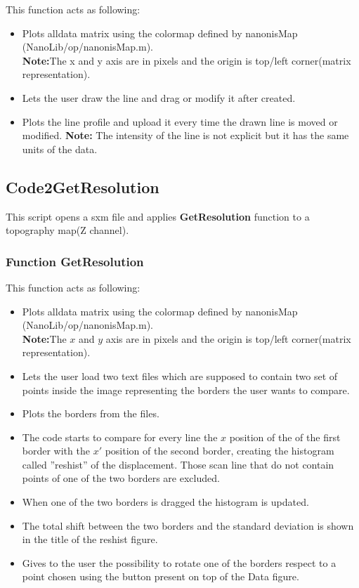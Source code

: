 This function acts as following:
\begin{itemize}  
\item Plots alldata matrix using the colormap defined by nanonisMap (NanoLib/op/nanonisMap.m).\\
\textbf{Note:}The x and y axis are in pixels and the origin is top/left corner(matrix representation).
\item Lets the user draw the line and drag or modify it after created.
\item Plots the line profile and upload it every time the drawn line is moved or modified.
\textbf{Note:} The intensity of the line is not explicit but it has the same units of the data.
\end{itemize}

\subsection{Code2GetResolution}

This script opens a sxm file and applies \textbf{GetResolution} function to a topography map(Z channel).

\subsubsection{Function GetResolution}

This function acts as following:
\begin{itemize}  
\item Plots alldata matrix using the colormap defined by nanonisMap (NanoLib/op/nanonisMap.m).\\
\textbf{Note:}The $x$ and $y$ axis are in pixels and the origin is top/left corner(matrix representation).
\item Lets the user load two text files which are supposed to contain two set of points inside the image representing the borders the user wants to compare.
\item Plots the borders from the files.
\item The code starts to compare for every line the $x$ position of the of the first border with the $x'$ position of the second border, creating the histogram called ''reshist'' of the displacement. Those scan line that do not contain points of one of the two borders are excluded.
\item When one of the two borders is dragged the histogram is updated.
\item The total shift between the two borders and the standard deviation is shown in the title of the reshist figure.
\item Gives to the user the possibility to rotate one of the borders respect to a point chosen using the button present on top of the Data figure. 
\end{itemize}

